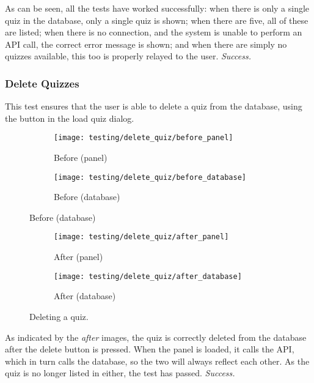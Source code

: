 As can be seen, all the tests have worked successfully: when there is only a single quiz in the database, only a single quiz is shown; when there are five, all of these are listed; when there is no connection, and the system is unable to perform an API call, the correct error message is shown; and when there are simply no quizzes available, this too is properly relayed to the user. \textit{Success.}


\subsubsection{Delete Quizzes}
This test ensures that the user is able to delete a quiz from the database, using the button in the load quiz dialog.

\begin{figure}[!htbp]
\centering
\begin{subfigure}{0.5\textwidth}
  \centering
  \texttt{[image: testing/delete\_quiz/before\_panel]}
  \caption{Before (panel)}
  \label{fig:sub1}
\end{subfigure}%
\begin{subfigure}{0.5\textwidth}
  \centering
  \texttt{[image: testing/delete\_quiz/before\_database]}
  \caption{Before (database)}
  \label{fig:sub2}
\end{subfigure}
\label{fig:test}
\end{figure}

\begin{figure}[!htbp]
\centering
\begin{subfigure}{0.5\textwidth}
  \centering
  \texttt{[image: testing/delete\_quiz/after\_panel]}
  \setcounter{subfigure}{2}%
  \caption{After (panel)}
  \label{fig:sub1}
\end{subfigure}%
\begin{subfigure}{0.5\textwidth}
  \centering
  \texttt{[image: testing/delete\_quiz/after\_database]}
  \setcounter{subfigure}{3}%
  \caption{After (database)}
  \label{fig:sub2}
\end{subfigure}
\caption{Deleting a quiz.}
\label{fig:test}
\end{figure}

As indicated by the \textit{after} images, the quiz is correctly deleted from the database after the delete button is pressed. When the panel is loaded, it calls the API, which in turn calls the database, so the two will always reflect each other. As the quiz is no longer listed in either, the test has passed. \textit{Success.}

